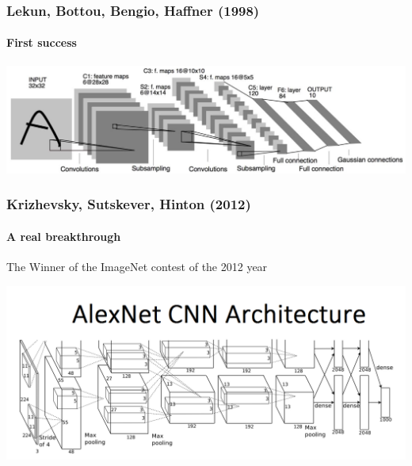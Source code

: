\documentclass[fullscreen=true, bookmarks=true, hyperref={pdfencoding=unicode}]{beamer}
\begin{document}
\begin{frame}
  \frametitle{Lekun, Bottou, Bengio, Haffner (1998)}
  \framesubtitle{First success}
  \begin{center}
    \includegraphics[keepaspectratio,
                     height=0.33\paperheight]{LeNet.jpg}
  \end{center}


\end{frame}


\begin{frame}
  \frametitle{Krizhevsky, Sutskever, Hinton (2012)}
    \framesubtitle{A real breakthrough}
    The Winner of the ImageNet contest of the 2012 year
  \begin{center}
    \includegraphics[keepaspectratio,
                     height=0.5\paperheight]{AlexNetCNN.png}
  \end{center}


\end{frame}
\end{document}
